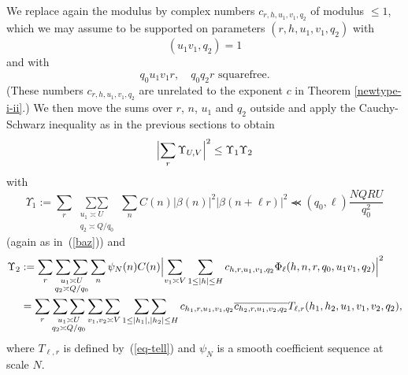 \documentclass[12pt,a4paper,reqno]{amsart}
\numberwithin{equation}{section}
\theoremstyle{plain}
\theoremstyle{definition}
\newcommand\eps{\varepsilon}
\def\stacksum#1#2{{\stackrel{{\scriptstyle #1}}
{{\scriptstyle #2}}}}
\newcommand\sumsum{\mathop{\sum\sum}\limits}
\renewcommand{\sim}{\asymp}
\renewcommand{\lessapprox}{\llcurly}
\begin{document}
We replace again the modulus by complex numbers $c_{r,h,u_1,v_1,q_2}$
of modulus $\leq 1$, which we may assume to be supported on parameters
$(r,h,u_1,v_1,q_2)$ with
$$
(u_1v_1,q_2)=1
$$
and with
$$
q_0u_1v_1r,\quad q_0q_2r\text{ squarefree}.
$$
(These numbers $c_{r,h,u_1,v_1,q_2}$ are unrelated to the exponent $c$ in Theorem \ref{newtype-i-ii}.)
We then move the sums over $r$, $n$, $u_1$ and $q_2$ outside
and apply the Cauchy-Schwarz inequality as in the previous sections to
obtain
$$
\Bigl|\sum_r\Upsilon_{U,V}\Bigr|^2\leq \Upsilon_1\Upsilon_2
$$
with
$$
\Upsilon_1:=\sum_r\sumsum_{\substack{u_1\sim U\\ q_2\sim Q/q_0}} \sum_n
C(n) |\beta(n)|^2|\beta(n+\ell r)|^2\lessapprox (q_0,\ell)\frac{NQRU}{q_0^2}
$$
(again as in~(\ref{baz})) and
\begin{align*}
  \Upsilon_2&:= \sum_r \sumsum_{\substack{u_1\sim U\\ q_2\sim Q/q_0}}
  \sum_{n}\psi_N(n)C(n) \Bigl| \sum_{v_1\sim V} \sum_{1 \leq |h| \leq
    H} c_{h,r,u_1,v_1,q_2}
  \Phi_{\ell}(h,n, r, q_0, u_1v_1,q_2)\Bigr|^2\\
  &=\sum_r\sumsum_{\substack{u_1\sim U\\q_2\sim Q/q_0}} \sumsum_{v_1,v_2\sim
    V} \sumsum_{1\leq |h_1|,|h_2|\leq H}
  c_{h_1,r,u_1,v_1,q_2}\overline{c_{h_2,r,u_1,v_2,q_2}}
  T_{\ell,r}(h_1,h_2,u_1,v_1,v_2,q_2),
\end{align*}
where $T_{\ell,r}$ is defined by~(\ref{eq-tell}) and $\psi_N$ is a smooth coefficient sequence at scale $N$.
\par
\end{document}
